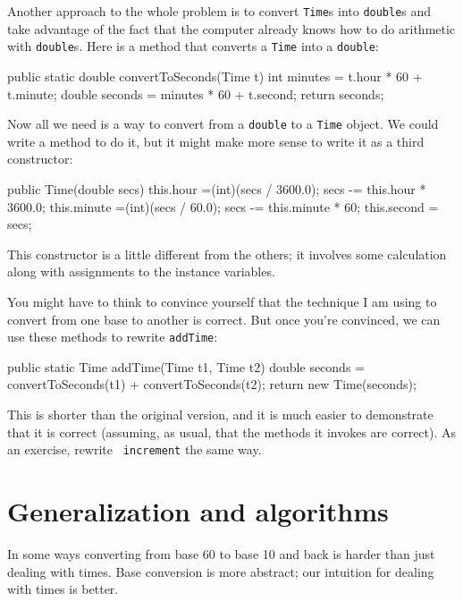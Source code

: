 Another approach to the whole problem is to convert
{\tt Time}s into {\tt double}s and take advantage of the fact that
the computer already knows how to do arithmetic with {\tt double}s.
Here is a method that converts a {\tt Time} into a {\tt double}:

\begin{code}
    public static double convertToSeconds(Time t) {
        int minutes = t.hour * 60 + t.minute;
        double seconds = minutes * 60 + t.second;
        return seconds;
    }
\end{code}

Now all we need is a way to convert from a {\tt double}
to a {\tt Time} object.  We could write a method to
do it, but it might make more sense to write it as a third
constructor:

\begin{code}
    public Time(double secs) {
        this.hour =(int)(secs / 3600.0);
        secs -= this.hour * 3600.0;
        this.minute =(int)(secs / 60.0);
        secs -= this.minute * 60;
        this.second = secs;
    }
\end{code}

This constructor is a little different from the others;
it involves some calculation along with assignments to the
instance variables.

You might have to think to convince yourself that the technique
I am using to convert from one base to another is correct.  But once
you're convinced, we can use these methods to rewrite {\tt addTime}:

\begin{code}
    public static Time addTime(Time t1, Time t2) {
        double seconds = convertToSeconds(t1) + convertToSeconds(t2);
        return new Time(seconds);
    }
\end{code}

This is shorter than the original version, and it is much easier
to demonstrate that it is correct (assuming, as usual, that the
methods it invokes are correct).  As an exercise, rewrite {\tt
increment} the same way.


\section{Generalization and algorithms}


In some ways converting from base 60 to base 10 and back is
harder than just dealing with times.  Base conversion is more
abstract; our intuition for dealing with times is better.

